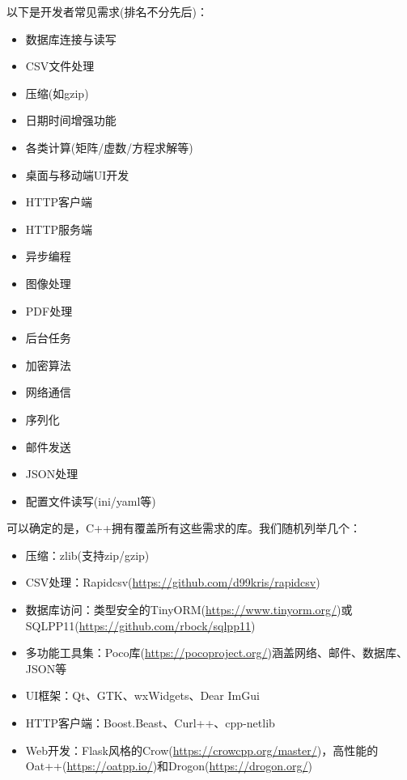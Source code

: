 
以下是开发者常见需求(排名不分先后)：

\begin{itemize}
\item 
数据库连接与读写

\item 
CSV文件处理

\item 
压缩(如gzip)

\item 
日期时间增强功能

\item 
各类计算(矩阵/虚数/方程求解等)

\item 
桌面与移动端UI开发

\item 
HTTP客户端

\item 
HTTP服务端

\item 
异步编程

\item 
图像处理

\item 
PDF处理

\item 
后台任务

\item 
加密算法

\item 
网络通信

\item 
序列化

\item 
邮件发送

\item 
JSON处理

\item 
配置文件读写(ini/yaml等)
\end{itemize}

可以确定的是，C++拥有覆盖所有这些需求的库。我们随机列举几个：

\begin{itemize}
\item 
压缩：zlib(支持zip/gzip)

\item 
CSV处理：Rapidcsv(\url{https://github.com/d99kris/rapidcsv})

\item 
数据库访问：类型安全的TinyORM(\url{https://www.tinyorm.org/})或SQLPP11(\url{https://github.com/rbock/sqlpp11})

\item 
多功能工具集：Poco库(\url{https://pocoproject.org/})涵盖网络、邮件、数据库、JSON等

\item 
UI框架：Qt、GTK、wxWidgets、Dear ImGui

\item 
HTTP客户端：Boost.Beast、Curl++、cpp-netlib

\item 
Web开发：Flask风格的Crow(\url{https://crowcpp.org/master/})，高性能的Oat++(\url{https://oatpp.io/})和Drogon(\url{https://drogon.org/})
\end{itemize}

